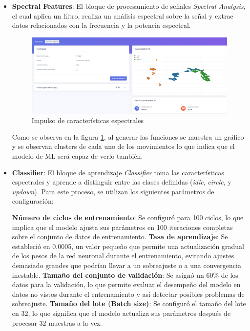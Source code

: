 \documentclass[12pt,a4paper]{article}
\begin{document}
\begin{itemize}
    \item \textbf{Spectral Features}: El bloque de procesamiento de señales \textit{Spectral Analysis}, el cual aplica un filtro, realiza un análisis espectral sobre la señal y extrae datos relacionados con la frecuencia y la potencia espectral.
    \begin{figure}[H]
    \centering
    \includegraphics[width=0.8\linewidth]{Imagenes/spectral_features.png}
    \caption{Impulso de características espectrales}
    \label{fig:9}
    \end{figure}
    Como se observa en la figura \ref{fig:9}, al generar las funciones se muestra un gráfico y se observan clusters de cada uno de los movimientos lo que indica que el modelo de ML será capaz de verlo también.

    \item \textbf{Classifier}: El bloque de aprendizaje \textit{Classifier} toma las características espectrales y aprende a distinguir entre las clases definidas (\textit{idle}, \textit{circle}, y \textit{updown}). Para este proceso, se utilizan los siguientes parámetros de configuración:

    \subitem \textbf{Número de ciclos de entrenamiento}: Se configuró para 100 ciclos, lo que implica que el modelo ajusta sus parámetros en 100 iteraciones completas sobre el conjunto de datos de entrenamiento.
    \subitem \textbf{Tasa de aprendizaje}: Se estableció en 0.0005, un valor pequeño que permite una actualización gradual de los pesos de la red neuronal durante el entrenamiento, evitando ajustes demasiado grandes que podrían llevar a un sobreajuste o a una convergencia inestable.
    \subitem \textbf{Tamaño del conjunto de validación}: Se asignó un 60\% de los datos para la validación, lo que permite evaluar el desempeño del modelo en datos no vistos durante el entrenamiento y así detectar posibles problemas de sobreajuste.
    \subitem \textbf{Tamaño del lote (Batch size)}: Se configuró el tamaño del lote en 32, lo que significa que el modelo actualiza sus parámetros después de procesar 32 muestras a la vez.


\end{itemize}
\end{document}
